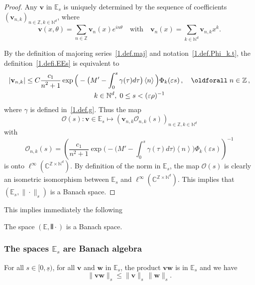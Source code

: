 \documentclass[AHL,Unicode,longabstracts,published]{cedram}
\theoremstyle{plain}
\newcommand*\e{\varepsilon}
\newcommand*\Cbb{{\mathbb C}}%
\newcommand*\N{{\mathbb N}}
\newcommand*\Z{{\mathbb Z}}
\newcommand*\EE{{\mathbb E}}
\newcommand*\g{\gamma}
\newcommand{\vbf}{{\mathbf v}}
\newcommand*\w{{\mathbf w}}
\newcommand*\und{\underline}
\DeclarePairedDelimiter{\VERT}{|\mkern -1.6mu|\mkern -1.6mu|}{|\mkern -1.6mu|\mkern -1.6mu|}
\renewcommand*{\forall}{\mathrel{\oldforall}}
\begin{document}
\begin{proof}
Any $\vbf$ in $\EE_{s}$ is uniquely determined by the sequence of coefficients $(\vbf_{n,k})_{n\in\Z,k\in\N^{d}}$, where
\[
\vbf(x,\theta) = \sum_{n\in\Z} \vbf_n(x) e^{in\theta} \quad \text{with} \quad \vbf_n(x) = \sum_{k\in\N^{d}} \vbf_{n,k}x^{k}.
\]


By the definition of majoring series~\eqref{1.def.maj} and notation~\eqref{1.def.Phi_k.t}, the definition~\eqref{1.defi.EEs} is equivalent to
\begin{multline*}
|\vbf_{n,k}| \leq C \frac{\displaystyle c_1}{\displaystyle n^2+1}\exp\Big({}-\big(M' - \int_{0}^{s} \g(\tau) d\tau \big)\left< n \right>\Big) \Phi_{k}(\e s) \,,\quad \forall n\in\Z\,,\\
k\in\N^{d},\; 0\leq s < (\e \rho)^{-1}
\end{multline*}
where $\g$ is defined in~\eqref{1.def.g}. Thus the map
\goodbreak
\begin{equation}
\mathcal{O}(s): \vbf\in\EE_{s} \mapsto \left(\vbf_{n,k} \mathcal{O}_{n,k}(s)\right)_{n\in\Z, k\in\N^{d}}
\end{equation}
with
\[
\mathcal{O}_{n,k}(s) = \left(\frac{\displaystyle c_1}{\displaystyle n^2+1}\exp\Big({}-\big(M' - \int_{0}^{s} \g(\tau) d\tau \big)\left< n \right>\Big) \Phi_{k}(\e s)\right)^{-1}
\]
is onto $ \ell^{\infty}(\Cbb^{\Z\times\N^{d}}) $. By definition of the norm in $\EE_{s}$, the map $\mathcal{O}(s)$ is clearly an isometric isomorphism between $\EE_{s}$ and $\ell^{\infty}(\Cbb^{\Z\times\N^{d}})$. This implies that $\left(\EE_{s},\|\cdot\|_{s}\right)$ is a Banach space.
\end{proof}

This implies immediately the following

\begin{coro}
The space $(\EE,\VERT{\cdot})$ is a Banach space.
\end{coro}


\subsubsection{The spaces \texorpdfstring{$\EE_s$}{EEs} are Banach algebra}


\begin{lemm}\label{1.lemma.algebra}
For all $s\in[0,\und{s})$, for all $\vbf$ and $\w$ in $\EE_{s}$, the product $ \vbf\w$ is in $\EE_{s} $ and we have
\begin{equation} 
\|\vbf \w\|_{s} \leq \|\vbf\|_{s} \, \|\w\|_{s}.
\end{equation}
\end{lemm}
\end{document}

